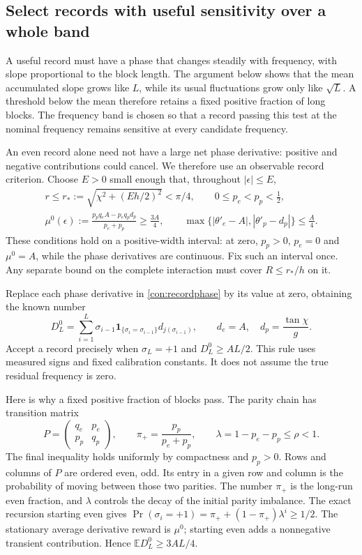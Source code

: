 \documentclass[11pt,a4paper]{article}
\numberwithin{equation}{section}
\theoremstyle{remark}
\begin{document}
\subsection{Select records with useful sensitivity over a whole band}
\label{con:gate}

A useful record must have a phase that changes steadily with frequency,
with slope proportional to the block length. The argument below shows
that the mean accumulated slope grows like $L$, while its usual
fluctuations grow only like $\sqrt L$. A threshold below the mean
therefore retains a fixed positive fraction of long blocks.
The frequency band is chosen so that a record passing this test at the
nominal frequency remains sensitive at every candidate frequency.

An even record alone need not have a large net phase derivative: positive
and negative contributions could cancel. We therefore use an observable
record criterion. Choose $E>0$ small enough that, throughout $|\epsilon|\le E$,
\begin{gather}
 r\le r_*:=\sqrt{\chi^2+(Eh/2)^2}<\pi/4,\qquad
 0\le p_e<p_p<\tfrac12,\nonumber\\
 \mu^0(\epsilon):=
 \frac{p_pq_eA-p_e q_p d_p}{p_e+p_p}\ge\frac{3A}{4},\qquad
 \max\{|\theta'_e-A|,|\theta'_p-d_p|\}\le\frac A4.
 \label{con:band}
\end{gather}
These conditions hold on a positive-width interval: at zero,
$p_p>0$, $p_e=0$ and $\mu^0=A$, while the phase derivatives are continuous.
Fix such an interval once. Any separate bound on the complete interaction
must cover $R\le r_*/h$ on it.

Replace each phase derivative in \eqref{con:recordphase} by its value
at zero, obtaining the known number
\begin{equation}
 D_L^0=\sum_{i=1}^L\sigma_{i-1}
 \mathbf1_{\{\sigma_i=\sigma_{i-1}\}}d_{j(\sigma_{i-1})},
 \qquad d_e=A,\quad d_p=\frac{\tan\chi}{g}.
\end{equation}
Accept a record precisely when $\sigma_L=+1$ and $D_L^0\ge AL/2$.
This rule uses measured signs and fixed calibration constants. It does not
assume the true residual frequency is zero.

Here is why a fixed positive fraction of blocks pass. The parity chain has
transition matrix
\begin{equation}
 P=\begin{pmatrix}q_e&p_e\\p_p&q_p\end{pmatrix},\qquad
 \pi_+=\frac{p_p}{p_e+p_p},\qquad
 \lambda=1-p_e-p_p\le\rho<1.
\end{equation}
The final inequality holds uniformly by compactness and $p_p>0$.
Rows and columns of $P$ are ordered even, odd. Its entry in a given row
and column is the probability of moving between those two parities.
The number $\pi_+$ is the long-run even fraction, and $\lambda$ controls
the decay of the initial parity imbalance.
The exact recursion starting even gives
$\Pr(\sigma_i=+1)=\pi_++(1-\pi_+)\lambda^i\ge1/2$.
The stationary average derivative reward is $\mu^0$; starting even adds
a nonnegative transient contribution. Hence
$\mathbb E D_L^0\ge3AL/4$.
\end{document}
